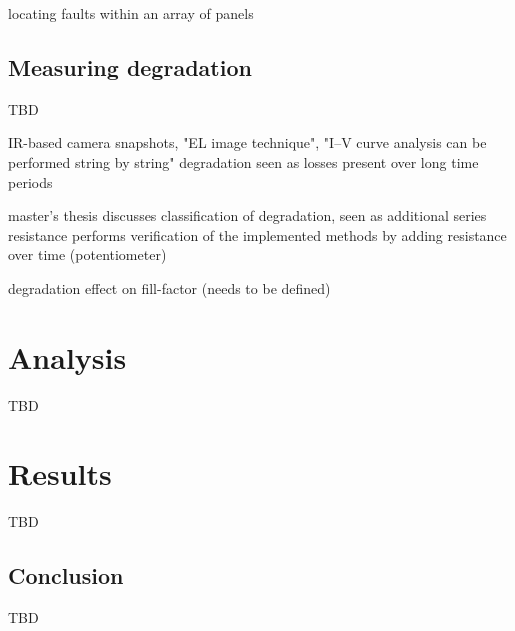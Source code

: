 locating faults within an array of panels \cite{Lin2012}

\section{Measuring degradation}
TBD

IR-based camera snapshots, "EL image technique", "I–V curve analysis can be performed string by string" \cite{Munoz2011}
degradation seen as losses present over long time periods \cite{Stettler2005}

master's thesis discusses classification of degradation, seen as additional series resistance \cite{Zhao2010thesis}
performs verification of the implemented methods by adding resistance over time (potentiometer)

degradation effect on fill-factor (needs to be defined) \cite{Raina2013}



\chapter{Analysis}
TBD


\chapter{Results}
TBD

\section{Conclusion}
TBD





